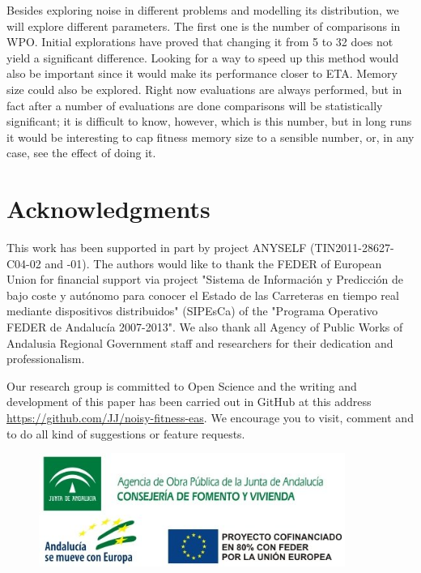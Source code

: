 \documentclass{llncs}
\begin{document}
Besides exploring noise in different problems and modelling its
distribution, we will explore different parameters. The first one is the number of comparisons in WPO. Initial
explorations have proved that changing it from 5 to 32 does not yield
a significant difference. Looking for a way to speed up this method
would also be important since it would make its performance closer to
ETA. Memory size could also be explored. Right now evaluations are
always performed, but in fact after a number of evaluations are done
comparisons will be statistically significant; it is difficult to
know, however, which is this number, but in long runs it would be
interesting to cap fitness memory size to a sensible number, or, in
any case, see the effect of doing it. 

\section{Acknowledgments}

This work has been supported in part by project ANYSELF
(TIN2011-28627-C04-02 and -01).
The authors would like to thank the FEDER of European Union for
financial support via project "Sistema de Información y Predicción de
bajo coste y autónomo para conocer el Estado de las Carreteras en
tiempo real mediante dispositivos distribuidos" (SIPEsCa) of the
"Programa Operativo FEDER de Andalucía 2007-2013". We also thank all
Agency of Public Works of Andalusia Regional Government staff and
researchers for their dedication and professionalism.

Our research group is committed to Open Science and the writing and
development of this paper has been carried out in GitHub at this
address \url{https://github.com/JJ/noisy-fitness-eas}. We encourage you
to visit, comment and to do all kind of suggestions or feature requests.

\begin{figure}[h]
\begin{center}
\includegraphics[width=10cm]{../images/logos_SIPESCA_2.jpg}
\end{center}
\end{figure}


\end{document}
